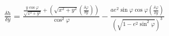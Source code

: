 \documentclass{standalone}
\begin{document}
    $\frac{\delta h}{\delta y} = \frac{\frac{y{\cos\varphi}}{\sqrt{x^2+y^2}} + (\sqrt{x^2+y^2} (\frac{\delta\varphi}{\delta y}))}{\cos^2 \varphi} - \frac{ a e^2 {\sin \varphi}{\cos \varphi} (\frac{\delta \varphi}{\delta y})}{ ( \sqrt{1 - e^2 {\sin^2 \varphi} } )^3 }$
\end{document}
